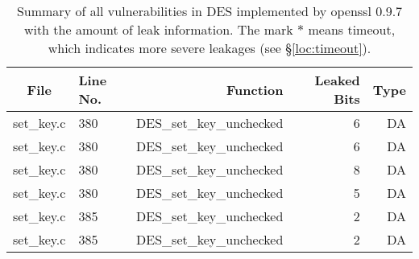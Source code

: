 \begin{table}%
\centering\tiny\scriptsize
\caption{Summary of all vulnerabilities in DES implemented by openssl 0.9.7 with the amount of leak information. The mark $*$ means timeout, which indicates more severe leakages (see \S\ref{loc:timeout}).}\label{tab:DESopenssl}
\begin{tabular}{clrrr}
\hline
\textbf{File} & \textbf{Line No.} & \textbf{Function} & \textbf{Leaked Bits} & \textbf{Type} \\\hline
set\_key.c& 380&DES\_set\_key\_unchecked&6 &DA\\
set\_key.c& 380&DES\_set\_key\_unchecked&6 &DA\\
set\_key.c& 380&DES\_set\_key\_unchecked&8 &DA\\
set\_key.c& 380&DES\_set\_key\_unchecked&5 &DA\\
set\_key.c& 385&DES\_set\_key\_unchecked&2 &DA\\
set\_key.c& 385&DES\_set\_key\_unchecked&2 &DA\\
\hline
\end{tabular}
\end{table}